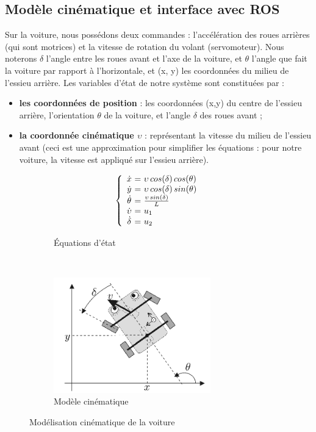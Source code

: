 \documentclass[12pt, openany]{report}
\begin{document}
\subsection{Modèle cinématique et interface avec \textsc{ROS}}
Sur la voiture, nous possédons deux commandes : l’accélération des roues arrières (qui sont motrices) et la vitesse de rotation du volant (servomoteur). Nous noterons $\delta$ l’angle entre les roues avant et l’axe de la voiture, et $\theta$ l’angle que fait la voiture par rapport à l’horizontale, et (x, y) les coordonnées du milieu de l’essieu arrière. Les variables d’état de notre système sont constituées par : 
\begin{itemize}[label=\textbullet, font=\small]
    \item \textbf{les coordonnées de position} : les coordonnées (x,y) du centre de l’essieu arrière, l’orientation $\theta$ de la voiture, et l’angle $\delta$ des roues avant ;
    \item \textbf{la coordonnée cinématique $\upsilon$} : représentant la vitesse du milieu de l’essieu avant (ceci est une approximation pour simplifier les équations : pour notre voiture, la vitesse est appliqué sur l'essieu arrière).
\end{itemize}
\begin{figure}[H]
     \centering
     \begin{subfigure}[b]{0.45\textwidth}
        \centering
            $$\left \{
            \begin{array}{c @{=} l}
                \dot{x}\ & \ \upsilon\, cos(\delta)\, cos(\theta) \\
                \dot{y}\ & \ \upsilon\, cos(\delta)\, sin(\theta) \\
                \dot{\theta}\ & \ \frac{\upsilon\, sin(\delta)}{L} \\
                \dot{\upsilon}\ & \ u_1 \\
                \dot{\delta}\ & \ u_2 
            \end{array}
            \right. $$
         \caption{Équations d'état}
     \end{subfigure}
     ~
     \begin{subfigure}[b]{0.45\textwidth}
         \centering
         \includegraphics[width=\textwidth, height = 5cm]{mod_cin.png}
         \caption{Modèle cinématique}
     \end{subfigure}
     \caption{Modélisation cinématique de la voiture}
     \label{fig:mod_dyn_vis}
\end{figure}
\end{document}
